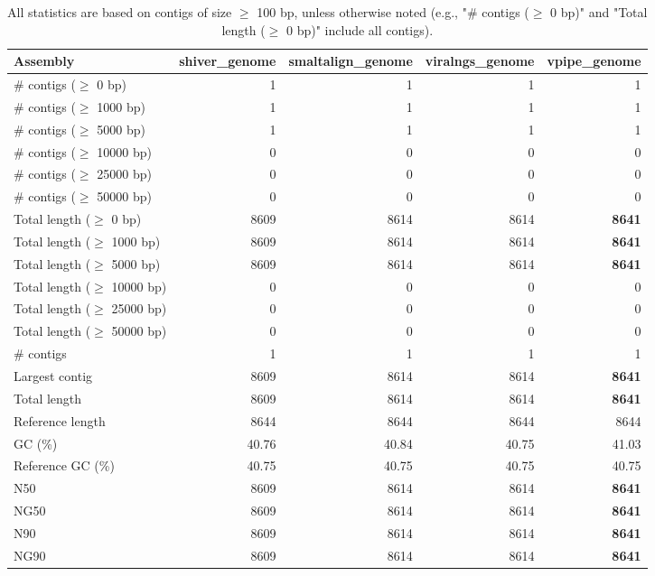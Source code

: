 \documentclass[12pt,a4paper]{article}
\begin{document}
\begin{table}[ht]
\begin{center}
\caption{All statistics are based on contigs of size $\geq$ 100 bp, unless otherwise noted (e.g., "\# contigs ($\geq$ 0 bp)" and "Total length ($\geq$ 0 bp)" include all contigs).}
\begin{tabular}{|l*{4}{|r}|}
\hline
Assembly & shiver\_genome & smaltalign\_genome & viralngs\_genome & vpipe\_genome \\ \hline
\# contigs ($\geq$ 0 bp) & 1 & 1 & 1 & 1 \\ \hline
\# contigs ($\geq$ 1000 bp) & 1 & 1 & 1 & 1 \\ \hline
\# contigs ($\geq$ 5000 bp) & 1 & 1 & 1 & 1 \\ \hline
\# contigs ($\geq$ 10000 bp) & 0 & 0 & 0 & 0 \\ \hline
\# contigs ($\geq$ 25000 bp) & 0 & 0 & 0 & 0 \\ \hline
\# contigs ($\geq$ 50000 bp) & 0 & 0 & 0 & 0 \\ \hline
Total length ($\geq$ 0 bp) & 8609 & 8614 & 8614 & {\bf 8641} \\ \hline
Total length ($\geq$ 1000 bp) & 8609 & 8614 & 8614 & {\bf 8641} \\ \hline
Total length ($\geq$ 5000 bp) & 8609 & 8614 & 8614 & {\bf 8641} \\ \hline
Total length ($\geq$ 10000 bp) & 0 & 0 & 0 & 0 \\ \hline
Total length ($\geq$ 25000 bp) & 0 & 0 & 0 & 0 \\ \hline
Total length ($\geq$ 50000 bp) & 0 & 0 & 0 & 0 \\ \hline
\# contigs & 1 & 1 & 1 & 1 \\ \hline
Largest contig & 8609 & 8614 & 8614 & {\bf 8641} \\ \hline
Total length & 8609 & 8614 & 8614 & {\bf 8641} \\ \hline
Reference length & 8644 & 8644 & 8644 & 8644 \\ \hline
GC (\%) & 40.76 & 40.84 & 40.75 & 41.03 \\ \hline
Reference GC (\%) & 40.75 & 40.75 & 40.75 & 40.75 \\ \hline
N50 & 8609 & 8614 & 8614 & {\bf 8641} \\ \hline
NG50 & 8609 & 8614 & 8614 & {\bf 8641} \\ \hline
N90 & 8609 & 8614 & 8614 & {\bf 8641} \\ \hline
NG90 & 8609 & 8614 & 8614 & {\bf 8641} \\ \hline

\end{tabular}
\end{center}
\end{table}
\end{document}
